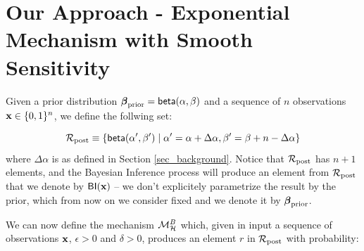 \documentclass[sigconf, anonymous]{acmart}
\begin{document}

\section{Our Approach - Exponential Mechanism with Smooth Sensitivity}
\label{sec_smoo}
Given a prior distribution $\boldsymbol{\beta}_{\textup{prior}}=\mathsf{beta}(\alpha, \beta)$ and a sequence of $n$ observations $\textbf{x}\in\{0,1\}^n$,
we define the follwing set:

\[
  \mathcal{R}_{\textup{post}}\equiv\{\mathsf{beta}(\alpha',\beta')\mid \alpha'=\alpha+\Delta\alpha, \beta'=\beta+n-\Delta\alpha\}
\]
where $\Delta\alpha$ is as defined in Section \ref{sec_background}.
Notice that $\mathcal{R}_{\textup{post}}$ has $n + 1$ elements, and the Bayesian Inference
process will produce an element from $\mathcal{R}_{\textup{post}}$ that we denote by
$\mathsf{BI}(\textbf{x})$ -- we don't explicitely parametrize the result by the
prior,  which from now on we consider fixed and we denote it by $\boldsymbol{\beta}_{\textup{prior}}$.


We can now define the mechanism $\mathcal{M}^{B}_{\mathcal{H}}$ which,
given in input a sequence of observations $\textbf{x}$, $\epsilon>0$ and $\delta>0$,
produces an element $r$ in $\mathcal{R}_{\textup{post}}$ with probability: 
\end{document}
